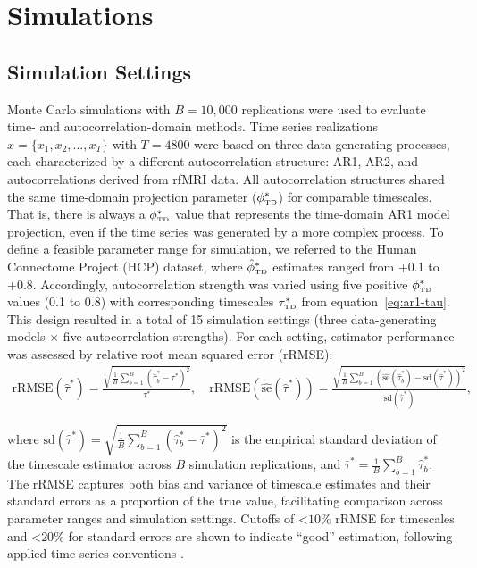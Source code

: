 \documentclass[docs/main.tex]{subfiles}
\begin{document}
\section{Simulations}\label{sec:simulations}

\subsection{Simulation Settings}
Monte Carlo simulations with $B = 10,000$ replications were used to evaluate time- and autocorrelation-domain methods. Time series realizations $x = \{x_1, x_2, ..., x_T\}$ with $T=4800$ were based on three data-generating processes, each characterized by a different autocorrelation structure: AR1, AR2, and autocorrelations derived from rfMRI data. All autocorrelation structures shared the same time-domain projection parameter ($\phi_{\scriptscriptstyle\text{TD}}^*$) for comparable timescales. That is, there is always a $\phi_{\scriptscriptstyle\text{TD}}^*$ value that represents the time-domain AR1 model projection, even if the time series was generated by a more complex process. To define a feasible parameter range for simulation, we referred to the Human Connectome Project (HCP) dataset, where $\hat{\phi}^*_{\scriptscriptstyle\text{TD}}$ estimates ranged from +0.1 to +0.8. Accordingly, autocorrelation strength was varied using five positive $\phi_{\scriptscriptstyle\text{TD}}^*$ values (0.1 to 0.8) with corresponding timescales $\tau_{\scriptscriptstyle\text{TD}}^*$ from equation~\eqref{eq:ar1-tau}. This design resulted in a total of 15 simulation settings (three data-generating models $\times$ five autocorrelation strengths). For each setting, estimator performance was assessed by relative root mean squared error (rRMSE):
\begin{align}
    \text{rRMSE}(\hat\tau^*) = \frac{\sqrt{\frac{1}{B} \sum_{b=1}^B (\hat\tau^*_b - \tau^*)^2}}{\tau^*}, \quad \text{rRMSE}(\widehat{\text{se}}(\hat\tau^*)) = \frac{\sqrt{\frac{1}{B} \sum_{b=1}^B \left(\widehat{\text{se}}(\hat\tau^*_b) - \text{sd}(\hat\tau^*)\right)^2}}{\text{sd}(\hat\tau^*)},
\end{align}

\noindent where $\text{sd}(\hat\tau^*) = \sqrt{\frac{1}{B} \sum_{b=1}^B (\hat\tau^*_b - \bar\tau^*)^2}$ is the empirical standard deviation of the timescale estimator across $B$ simulation replications, and $\bar\tau^* = \frac{1}{B} \sum_{b=1}^B \hat\tau^*_b$. The rRMSE captures both bias and variance of timescale estimates and their standard errors as a proportion of the true value, facilitating comparison across parameter ranges and simulation settings. Cutoffs of <$10\%$ rRMSE for timescales and <$20\%$ for standard errors are shown to indicate ``good'' estimation, following applied time series conventions \citep{jadon_comprehensive_2024}.\\
\end{document}
